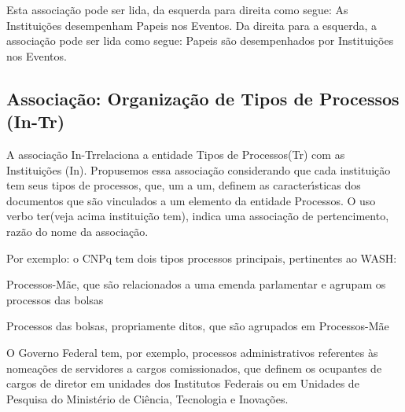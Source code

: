 \documentclass[
12pt,		%
openright,	%
twoside,  %
a4paper,			%
chapter=TITLE,		%
english,			%
french,				%
spanish,			%
brazil				%
]{USPSC-classe/USPSC}
\begin{document}
Esta associa\c{c}\~ao pode ser lida, da esquerda para direita como segue: \textquotedbl As Institui\c{c}\~oes desempenham Papeis nos Eventos\textquotedbl . Da direita para a esquerda, a associa\c{c}\~ao pode ser lida como segue: \textquotedbl Papeis s\~ao desempenhados por Institui\c{c}\~oes nos Eventos\textquotedbl .










\subsection[Associa\c{c}\~ao: Organiza\c{c}\~ao de Tipos de Processos (In-Tr)]{Associa\c{c}\~ao: Organiza\c{c}\~ao de Tipos de Processos (In-Tr)}\label{Associa\c{c}\~ao: Organiza\c{c}\~ao de Tipos de Processos (In-Tr)}
A associa\c{c}\~ao \textquotedbl In-Tr\textquotedbl  relaciona a entidade \textquotedbl Tipos de Processos\textquotedbl  (Tr) com as Institui\c{c}\~oes (In). Propusemos essa associa\c{c}\~ao considerando que cada institui\c{c}\~ao tem seus tipos de processos, que, um a um, definem as caracter\'{\i}sticas dos documentos que s\~ao vinculados a um elemento da entidade \textquotedbl Processos\textquotedbl . O uso verbo \textquotedbl ter\textquotedbl  (veja acima \textquotedbl institui\c{c}\~ao tem\textquotedbl ), indica uma associa\c{c}\~ao de pertencimento, raz\~ao do nome da associa\c{c}\~ao.










Por exemplo: o CNPq tem dois tipos processos principais, pertinentes ao WASH:











\begin{alineas}
\item Processos-M\~ae, que s\~ao relacionados a uma emenda parlamentar e agrupam os processos das bolsas
\item Processos das bolsas, propriamente ditos, que s\~ao agrupados em Processos-M\~ae
\end{alineas}

O Governo Federal tem, por exemplo, processos administrativos referentes \`as nomea\c{c}\~oes de servidores a cargos comissionados, que definem os ocupantes de cargos de diretor em unidades dos Institutos Federais ou em Unidades de Pesquisa do Minist\'erio de Ci\^encia, Tecnologia e Inova\c{c}\~oes.
\end{document}
